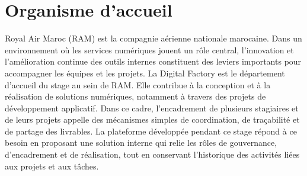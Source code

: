\section{Organisme d'accueil}
Royal Air Maroc (RAM) est la compagnie aérienne nationale marocaine. Dans un environnement où les services numériques jouent un rôle central, l'innovation et l'amélioration continue des outils internes constituent des leviers importants pour accompagner les équipes et les projets. La Digital Factory est le département d'accueil du stage au sein de RAM. Elle contribue à la conception et à la réalisation de solutions numériques, notamment à travers des projets de développement applicatif. Dans ce cadre, l'encadrement de plusieurs stagiaires et de leurs projets appelle des mécanismes simples de coordination, de traçabilité et de partage des livrables. La plateforme développée pendant ce stage répond à ce besoin en proposant une solution interne qui relie les rôles de gouvernance, d'encadrement et de réalisation, tout en conservant l'historique des activités liées aux projets et aux tâches.
